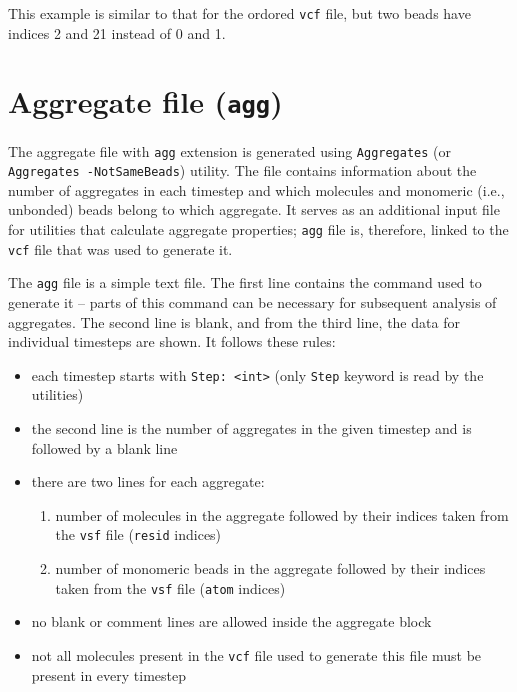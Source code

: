 This example is similar to that for the ordored \texttt{vcf} file, but two
beads have indices 2 and 21 instead of 0 and 1. %

\section{Aggregate file (\texttt{agg})} \label{sec:AggFile} %

The aggregate file with \texttt{agg} extension is generated using
\texttt{Aggregates} (or \texttt{Aggregates -NotSameBeads}) utility. The
file contains information about the number of aggregates in each timestep
and which molecules and monomeric (i.e., unbonded) beads belong to which
aggregate. It serves as an additional input file for utilities that
calculate aggregate properties; \texttt{agg} file is, therefore, linked to
the \texttt{vcf} file that was used to generate it.

The \texttt{agg} file is a simple text file. The first line contains the
command used to generate it -- parts of this command can be necessary for
subsequent analysis of aggregates. The second line is blank, and from the
third line, the data for individual timesteps are shown. It follows these
rules:

\begin{itemize}[topsep=0pt,itemsep=0pt]
  \item each timestep starts with \texttt{Step: <int>} (only \texttt{Step}
    keyword is read by the utilities)
  \item the second line is the number of aggregates in the given
    timestep and is followed by a blank line
  \item there are two lines for each aggregate:
  \begin{enumerate}[topsep=0pt,itemsep=0pt]
    \item number of molecules in the aggregate followed by their indices
      taken from the \texttt{vsf} file (\texttt{resid} indices)
    \item number of monomeric beads in the aggregate followed by their
      indices taken from the \texttt{vsf} file (\texttt{atom} indices)
  \end{enumerate}
  \item no blank or comment lines are allowed inside the aggregate block
  \item not all molecules present in the \texttt{vcf} file used to generate
    this file must be present in every timestep
\end{itemize}


